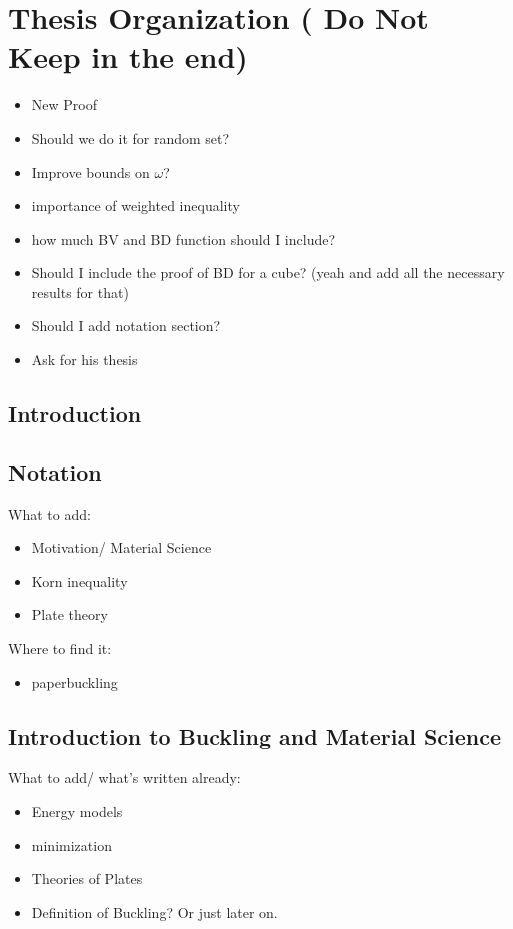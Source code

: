 \chapter{Thesis Organization ( Do Not Keep in the end)}

\begin{itemize}
    \item New Proof
    \item Should we do it for random set?
    \item Improve bounds on $\omega$?
    \item importance of weighted inequality
    \item how much BV and BD function should I include?
    \item Should I include the proof of BD for a cube? (yeah and add all the necessary results for that)
    \item Should I add notation section?
    \item Ask for his thesis
\end{itemize}
\section{Introduction}


\section{Notation}

What to add:
\begin{itemize}
    \item Motivation/ Material Science
    \item Korn inequality
    \item Plate theory
\end{itemize}
Where to find it:
\begin{itemize}
    \item paperbuckling
\end{itemize}
\section{Introduction to Buckling and Material Science}
What to add/ what's written already:
\begin{itemize}
    \item Energy models
    \item minimization
    \item Theories of Plates
    \item Definition of Buckling? Or just later on.
\end{itemize}
